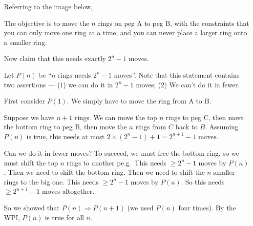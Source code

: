 \documentclass[a4paper]{article}
\begin{document}
\begin{eg}
  Referring to the image below,
  \begin{center}
    \usetikzlibrary{shapes}
  \end{center}
  The objective is to move the $n$ rings on peg A to peg B, with the constraints that you can only move one ring at a time, and you can never place a larger ring onto a smaller ring.

  Now claim that this needs exactly $2^n - 1$ moves.

  Let $P(n)$ be ``$n$ rings needs $2^n - 1$ moves''. Note that this statement contains two assertions --- (1) we can do it in $2^n - 1$ moves; (2) We can't do it in fewer.

  First consider $P(1)$. We simply have to move the ring from A to B.

  Suppose we have $n + 1$ rings. We can move the top $n$ rings to peg C, then move the bottom ring to peg B, then move the $n$ rings from $C$ back to $B$. Assuming $P(n)$ is true, this needs at most $2\times (2^n - 1) + 1 = 2^{n + 1} -1 $ moves.

  Can we do it in fewer moves? To succeed, we must free the bottom ring, so we must shift the top $n$ rings to another pe.g.\ This needs $\geq 2^n - 1$ moves by $P(n)$. Then we need to shift the bottom ring. Then we need to shift the $n$ smaller rings to the big one. This needs $\geq 2^n - 1$ moves by $P(n)$. So this needs $\geq 2^{n + 1} - 1$ moves altogether.

  So we showed that $P(n)\Rightarrow P(n + 1)$ (we used $P(n)$ four times). By the WPI, $P(n)$ is true for all $n$.
\end{eg}
\end{document}
